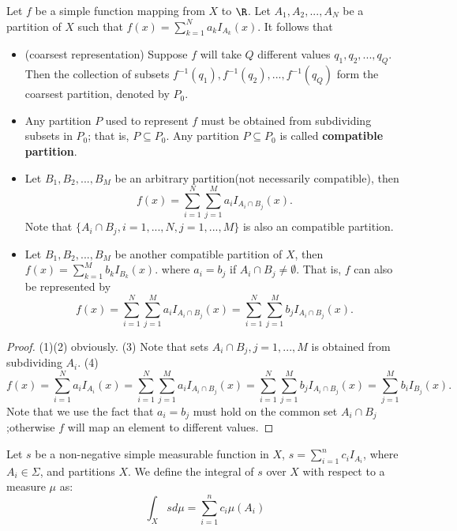 \begin{refsection}
\begin{lemma}\cite[16]{cheng2008crash}\label{ch:calculus:th:DifferentRepresentationSimpleFunctions}
Let $f$ be a simple function mapping from $X$ to $\R$. Let $A_1,A_2,...,A_N$ be a partition of $X$ such that
	$f(x) = \sum_{k=1}^N a_k I_{A_k}(x).$ It follows that
\begin{itemize}
	\item (coarsest representation) Suppose $f$ will take $Q$ different values $q_1,q_2,...,q_Q$. Then the collection of subsets $f^{-1}(q_1),f^{-1}(q_2),...,f^{-1}(q_Q)$ form the coarsest partition, denoted by $P_0$.
	\item Any partition $P$ used to represent $f$ must be obtained from subdividing subsets in $P_0$; that is, $P\subseteq P_0$. Any partition $P \subseteq P_0$ is called \textbf{compatible partition}.
	\item Let $B_1,B_2,...,B_M$ be an arbitrary partition(not necessarily compatible), then 
	$$f(x) = \sum_{i=1}^N\sum_{j=1}^M a_i I_{A_i \cap B_j}(x).$$
	Note that $\{A_i\cap B_j, i=1,...,N,j=1,...,M\}$ is also an compatible partition.
	\item Let $B_1,B_2,...,B_M$ be another compatible partition of $X$, then $f(x) = \sum_{k=1}^M b_k I_{B_k}(x).$
	where $a_i = b_j$ if $A_i \cap B_j \neq \emptyset$. That is,
	$f$ can also be represented by
	$$f(x) = \sum_{i=1}^N\sum_{j=1}^M a_i I_{A_i \cap B_j}(x) = \sum_{i=1}^N\sum_{j=1}^M b_j I_{A_i \cap B_j}(x).$$
	
\end{itemize}	
\end{lemma}
\begin{proof}
(1)(2) obviously. (3) Note that sets $A_i\cap B_j,j=1,...,M$ is obtained from subdividing $A_i$. (4)
$$f(x) = \sum_{i=1}^N a_i I_{A_i}(x) = \sum_{i=1}^N\sum_{j=1}^M a_i I_{A_i \cap B_j}(x) = \sum_{i=1}^N\sum_{j=1}^M b_j I_{A_i \cap B_j}(x) = \sum_{j=1}^M b_i I_{B_j}(x).$$
Note that we use the fact that $a_i=b_j$ must hold on the common set $A_i\cap B_j$;otherwise $f$ will map an element to different values.	
\end{proof}



\begin{definition}\cite[368]{johnsonbaugh2010foundations}\cite[16]{cheng2008crash}
	Let $s$ be a non-negative simple measurable function in $X$, $s=\sum_{i=1}^n c_i I_{A_i}$, where $A_i \in \Sigma$, and partitions $X$. We define the integral of $s$ over $X$ with respect to a measure $\mu$ as:
	$$\int_X s d\mu = \sum_{i=1}^n c_i \mu(A_i)$$
\end{definition}


\end{refsection}
